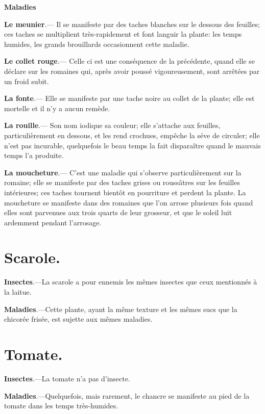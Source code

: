 \documentclass[10pt,a4paper]{book}
\begin{document}
\textbf{Maladies}

\textbf{Le meunier}.--- Il se manifeste par des taches blanches sur le dessous des feuilles; ces taches se multiplient très-rapidement et font languir la plante: les temps humides, les grands brouillards occasionnent cette maladie.

\textbf{Le collet rouge}.--- Celle ci est une conséquence de la précédente, quand elle se déclare sur les romaines qui, après avoir poussé vigoureusement, sont arrêtées par un froid subit.

\textbf{La fonte}.--- Elle se manifeste par une tache noire au collet de la plante; elle est mortelle et il n'y a aucun remède.

\textbf{La rouille}.--- Son nom iodique sa couleur; elle s'attache aux feuilles, particulièrement en dessous, et les rend crochues, empêche la séve de circuler; elle n'est pas incurable, quelquefois le beau temps la fait disparaître quand le mauvais temps l'a produite.

\textbf{La moucheture}.--- C'est une maladie qui s'observe particulièrement sur la romaine; elle se manifeste par des taches grises ou roussâtres sur les feuilles intérieures; ces taches tournent bientôt en pourriture et perdent la plante. La moucheture se manifeste dans des romaines que l'on arrose plusieurs fois quand elles sont parvenues aux trois quarts de leur grosseur, et que le soleil luit ardemment pendant l'arrosage.

\section{Scarole.}

\textbf{Insectes}.---La scarole a pour ennemis les mêmes insectes que ceux mentionnés à la laitue.

\textbf{Maladies}.---Cette plante, ayant la même texture et les mêmes sucs que la chicorée frisée, est sujette aux mêmes maladies.

\section{Tomate.}

\textbf{Insectes}.---La tomate n'a pas d'insecte.

\textbf{Maladies}.---Quelquefois, mais rarement, le chancre se manifeste au pied de la tomate dans les temps très-humides.
\\\\
\end{document}
